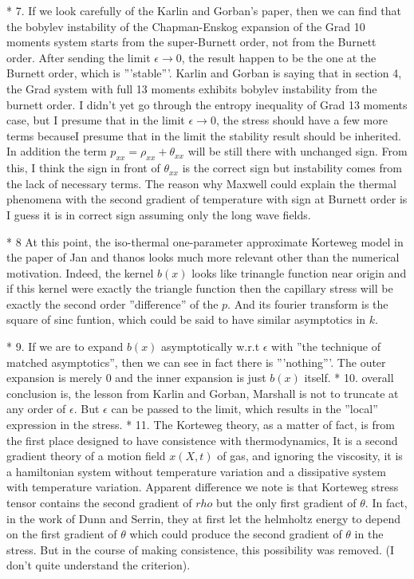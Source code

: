 \documentclass[a4paper,12pt]{article}
\begin{document}
  * 7. If we look carefully of the Karlin and Gorban's paper, then we can find that the bobylev instability of the Chapman-Enskog expansion of the Grad 10 moments system starts from the super-Burnett order, not from the Burnett order. After sending the limit $\epsilon \rightarrow 0$, the result happen to be the one at the Burnett order, which is '''stable'''. Karlin and Gorban is saying that in section 4, the Grad system with full 13 moments exhibits bobylev instability from the burnett order. I didn't yet go through the entropy inequality of Grad 13 moments case, but I presume that in the limit $\epsilon \rightarrow 0$, the stress should have a few more terms becauseI presume that in the limit the stability result should be inherited. In addition the term {{{ $p_{xx} = \rho_{xx} + \theta_{xx}$}}} will be still there with unchanged sign. From this, I think the sign in front of {{{$\theta_{xx}$}}} is the correct sign but instability comes from the lack of necessary terms. The reason why Maxwell could explain the thermal phenomena with the second gradient of temperature with sign at Burnett order is I guess it is in correct sign assuming only the long wave fields.

  * 8 At this point, the iso-thermal one-parameter approximate Korteweg model in the paper of Jan and thanos looks much more relevant other than the numerical motivation. Indeed, the kernel $b(x)$ looks like trinangle function near origin and if this kernel were exactly the triangle function then the capillary stress will be exactly the second order ''difference'' of the $p$. And its fourier transform is the square of sinc funtion, which could be said to have similar asymptotics in $k$.

  * 9. If we are to expand $b(x)$ asymptotically w.r.t $\epsilon$ with ''the technique of matched asymptotics'', then we can see in fact there is '''nothing'''. The outer expansion is merely $0$ and the inner expansion is just $b(x)$ itself.
  * 10. overall conclusion is, the lesson from Karlin and Gorban, Marshall is not to truncate at any order of $\epsilon$. But $\epsilon$ can be passed to the limit, which results in the ''local'' expression in the stress.
  * 11. The Korteweg theory, as a matter of fact, is from the first place designed to have consistence with thermodynamics, It is a second gradient theory of a motion field $x(X,t)$ of gas, and ignoring the viscosity, it is a hamiltonian system without temperature variation and a dissipative system with temperature variation. Apparent difference we note is that Korteweg stress tensor contains the second gradient of $rho$ but the only first gradient of $\theta$. In fact, in the work of Dunn and Serrin, they at first let the helmholtz energy to depend on the first gradient of $\theta$ which could produce the second gradient of $\theta$ in the stress. But in the course of making consistence, this possibility was removed. (I don't quite understand the criterion).
\end{document}
